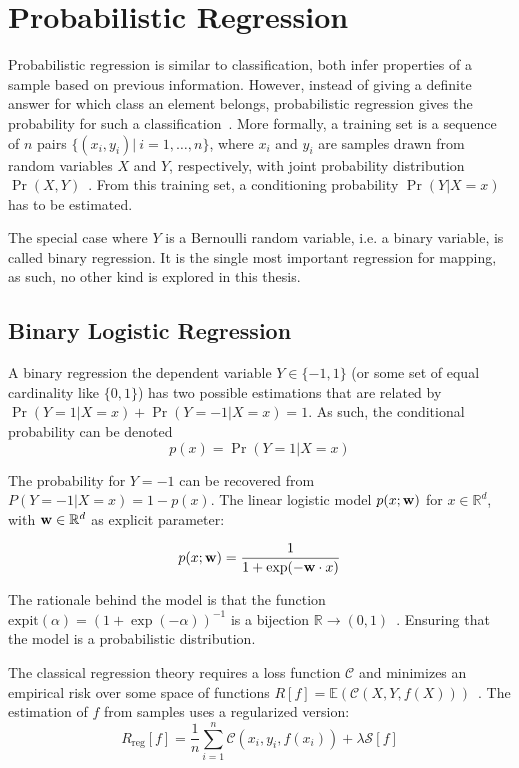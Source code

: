 
\section{Probabilistic Regression}

Probabilistic regression is similar to classification, both infer properties of
a sample based on previous information. However, instead of giving a definite
answer for which class an element belongs, probabilistic regression gives the
probability for such a classification~\cite{jaakkola1999probabilistic}. More
formally, a training set is a sequence of $n$ pairs
$\{(x_i,y_i)|~i=1,\ldots,n\}$, where $x_i$ and $y_i$ are samples drawn from
random variables $X$ and $Y$, respectively, with joint probability distribution
$\Pr(X,Y)$~\cite{friedman2001elements}. From this training set, a conditioning
probability $\Pr(Y|X=x)$ has to be estimated.

The special case where $Y$ is a Bernoulli random variable, i.e. a binary
variable, is called binary regression. It is the single most important
regression for mapping, as such, no other kind is explored in this thesis. 

\subsection{Binary Logistic Regression} 
\label{ss:blr}
A binary regression the dependent variable $Y\in\{-1,1\}$
(or some set of equal cardinality like $\{0,1\}$) has two
possible estimations that are related by $\Pr(Y=1|X=x)+\Pr(Y=-1|X=x)=1$. As
such, the conditional probability can be denoted
\begin{equation*}
p(x) = \Pr(Y=1|X=x) 
\end{equation*}

The probability for $Y=-1$ can be recovered from $P(Y=-1|X=x)=1-p(x)$. The
linear logistic model $p(x;\mathrm{\mathbf{w}})$ for $x\in\mathbb{R}^d$, with
$\mathrm{\mathbf{w}}\in\mathbb{R}^d$ as explicit parameter:

\begin{equation}
\label{eq:std_linear_logistic}
p(x;\mathrm{\mathbf{w}}) = \frac{1}{1+\exp(-\mathrm{\mathbf{w}}\cdot x)}
\end{equation}

The rationale behind the model is that the function
$\text{expit}(\alpha)=(1+\exp(-\alpha))^{-1}$ is a bijection
$\mathbb{R}\to(0,1)$~\cite{friedman2001elements}. Ensuring that the model is a
probabilistic distribution.

The classical regression theory requires a loss function $\mathscr{C}$ and
minimizes an empirical risk over some space of functions
$R[f]=\mathbb{E}(\mathscr{C}(X,Y,f(X)))$~\cite{jaakkola1999probabilistic}. The
estimation of $f$ from samples uses a regularized version:
\begin{equation}
R_{\text{reg}}[f] =
\frac{1}{n}\sum_{i=1}^n\mathscr{C}(x_i,y_i,f(x_i))+\lambda\mathcal{S}[f]
\end{equation}

